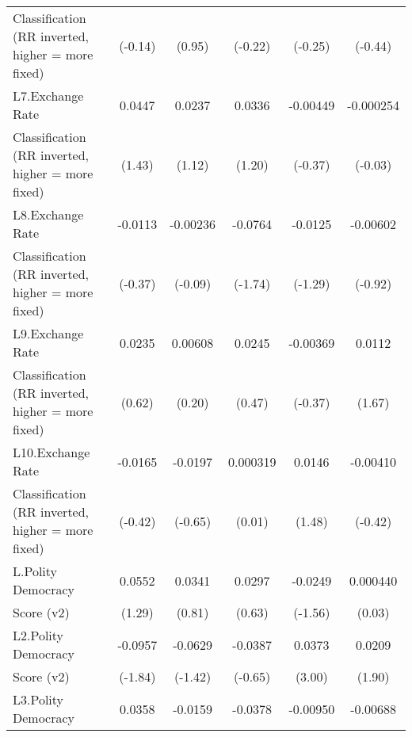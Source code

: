{\begin{tabular}{l*{5}{c}}
Classification (RR inverted, higher = more fixed)&     (-0.14)         &      (0.95)         &     (-0.22)         &     (-0.25)         &     (-0.44)         \\
[1em]
L7.Exchange Rate    &      0.0447         &      0.0237         &      0.0336         &    -0.00449         &   -0.000254         \\
Classification (RR inverted, higher = more fixed)&      (1.43)         &      (1.12)         &      (1.20)         &     (-0.37)         &     (-0.03)         \\
[1em]
L8.Exchange Rate    &     -0.0113         &    -0.00236         &     -0.0764         &     -0.0125         &    -0.00602         \\
Classification (RR inverted, higher = more fixed)&     (-0.37)         &     (-0.09)         &     (-1.74)         &     (-1.29)         &     (-0.92)         \\
[1em]
L9.Exchange Rate    &      0.0235         &     0.00608         &      0.0245         &    -0.00369         &      0.0112         \\
Classification (RR inverted, higher = more fixed)&      (0.62)         &      (0.20)         &      (0.47)         &     (-0.37)         &      (1.67)         \\
[1em]
L10.Exchange Rate   &     -0.0165         &     -0.0197         &    0.000319         &      0.0146         &    -0.00410         \\
Classification (RR inverted, higher = more fixed)&     (-0.42)         &     (-0.65)         &      (0.01)         &      (1.48)         &     (-0.42)         \\
[1em]
L.Polity Democracy  &      0.0552         &      0.0341         &      0.0297         &     -0.0249         &    0.000440         \\
Score (v2)          &      (1.29)         &      (0.81)         &      (0.63)         &     (-1.56)         &      (0.03)         \\
[1em]
L2.Polity Democracy &     -0.0957         &     -0.0629         &     -0.0387         &      0.0373\sym{**} &      0.0209         \\
Score (v2)          &     (-1.84)         &     (-1.42)         &     (-0.65)         &      (3.00)         &      (1.90)         \\
[1em]
L3.Polity Democracy &      0.0358         &     -0.0159         &     -0.0378         &    -0.00950         &    -0.00688         \\

\end{tabular}}
